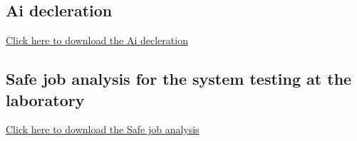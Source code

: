 \subsection{Ai decleration}
\href{http://github.com/BrageSolem/Acoustic-perception---Bachelor-Thesis/blob/main/Appendix%20files/KI%20-%20digital%20sjekkliste.docx}{Click here to download the Ai decleration}

\subsection{Safe job analysis for the system testing at the laboratory}
\href{https://github.com/BrageSolem/Acoustic-perception---Bachelor-Thesis/blob/main/Appendix%20files/Safe%20job%20analysis%20for%20the%20system%20testing%20at%20the%20laboratory.docx}{Click here to download the Safe job analysis}